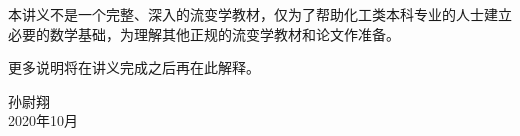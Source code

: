 \documentclass[main.tex]{subfiles}
\begin{document}
本讲义不是一个完整、深入的流变学教材，仅为了帮助化工类本科专业的人士建立必要的数学基础，为理解其他正规的流变学教材和论文作准备。

更多说明将在讲义完成之后再在此解释。
\begin{flushright}
孙尉翔\\
2020年10月
\end{flushright}
\end{document}
